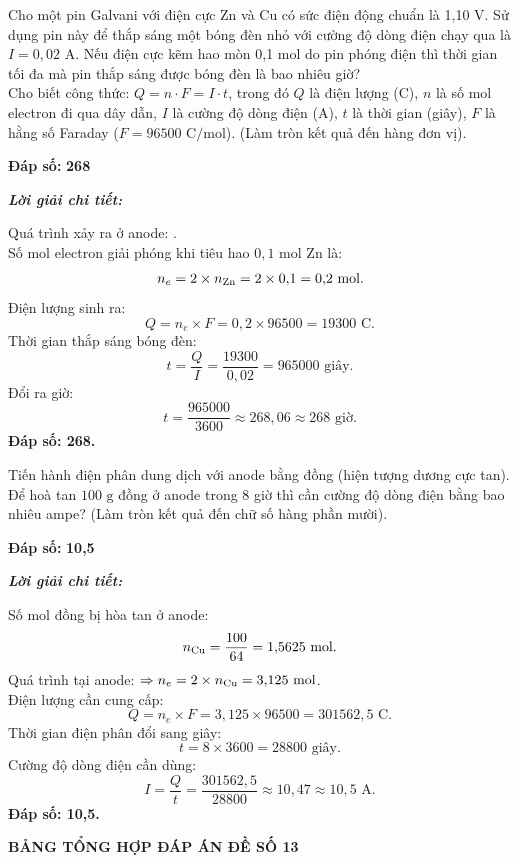 \documentclass[11pt,a4paper]{article}
\def\loigiai#1{
\par\begingroup\color{blue!80!black}\small
\noindent\textbf{\textit{Lời giải chi tiết:}}\par
#1\par\endgroup}
\begin{document}
\begin{ex}
Cho một pin Galvani với điện cực Zn và Cu có sức điện động chuẩn là 1,10 V. Sử dụng pin này để thắp sáng một bóng đèn nhỏ với cường độ dòng điện chạy qua là $I = 0{,}02\text{ A}$. Nếu điện cực kẽm hao mòn 0,1 mol do pin phóng điện thì thời gian tối đa mà pin thắp sáng được bóng đèn là bao nhiêu giờ?\\
Cho biết công thức: $Q = n \cdot F = I \cdot t$, trong đó $Q$ là điện lượng (C), $n$ là số mol electron đi qua dây dẫn, $I$ là cường độ dòng điện (A), $t$ là thời gian (giây), $F$ là hằng số Faraday ($F = 96500\text{ C/mol}$). (Làm tròn kết quả đến hàng đơn vị).
\par\noindent\textbf{Đáp số:} \textbf{\color{red}268}
\loigiai{
Quá trình xảy ra ở anode: .\\
Số mol electron giải phóng khi tiêu hao $0{,}1\text{ mol}$ Zn là:
$$n_e = 2 \times n_{\ce{Zn}} = 2 \times 0{,}1 = 0{,}2\text{ mol.}$$
Điện lượng sinh ra:
$$Q = n_e \times F = 0{,}2 \times 96500 = 19300\text{ C.}$$
Thời gian thắp sáng bóng đèn:
$$t = \frac{Q}{I} = \frac{19300}{0{,}02} = 965000\text{ giây.}$$
Đổi ra giờ:
$$t = \frac{965000}{3600} \approx 268{,}06 \approx 268\text{ giờ.}$$
\textbf{Đáp số: 268.}}
\end{ex}

\begin{ex}
Tiến hành điện phân dung dịch  với anode bằng đồng (hiện tượng dương cực tan). Để hoà tan $100\text{ g}$ đồng ở anode trong 8 giờ thì cần cường độ dòng điện bằng bao nhiêu ampe? (Làm tròn kết quả đến chữ số hàng phần mười).
\par\noindent\textbf{Đáp số:} \textbf{\color{red}10,5}
\loigiai{
Số mol đồng bị hòa tan ở anode:
$$n_{\ce{Cu}} = \frac{100}{64} = 1{,}5625\text{ mol.}$$
Quá trình tại anode: \ce{Cu -> Cu^2+ + 2e} $\Rightarrow n_e = 2 \times n_{\ce{Cu}} = 3{,}125\text{ mol}$.\\
Điện lượng cần cung cấp:
$$Q = n_e \times F = 3{,}125 \times 96500 = 301562{,}5\text{ C.}$$
Thời gian điện phân đổi sang giây:
$$t = 8 \times 3600 = 28800\text{ giây.}$$
Cường độ dòng điện cần dùng:
$$I = \frac{Q}{t} = \frac{301562{,}5}{28800} \approx 10{,}47 \approx 10{,}5\text{ A.}$$
\textbf{Đáp số: 10,5.}}
\end{ex}



\vspace{0.5cm}
\begin{center}
	\textbf{\Large\color{mainGreen}BẢNG TỔNG HỢP ĐÁP ÁN ĐỀ SỐ 13}
\end{center}
\end{document}
